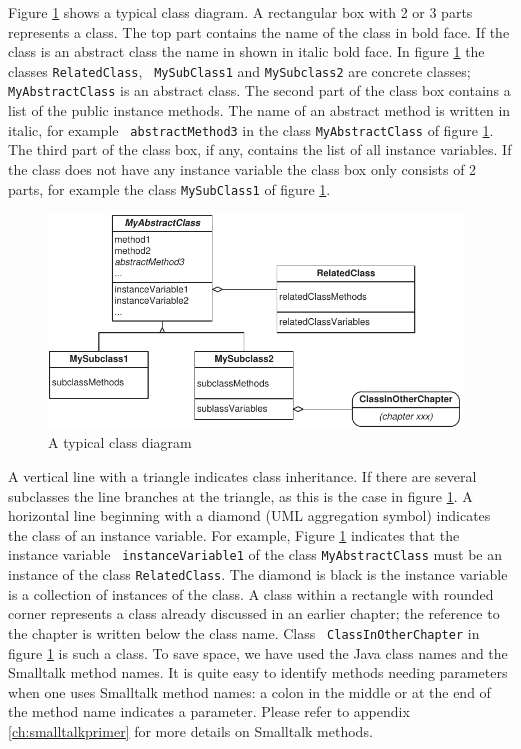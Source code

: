 \documentclass[twoside]{book}
\begin{document}
Figure \ref{fig:classDiagram} shows a typical class diagram. A
rectangular box with 2 or 3 parts represents a class. The top part
contains the name of the class in bold face. If the class is an
abstract class the name in shown in italic bold face. In figure
\ref{fig:classDiagram} the classes {\tt RelatedClass}, {\tt
MySubClass1} and {\tt MySubclass2} are concrete classes; {\tt
MyAbstractClass} is an abstract class. The second part of the
class box contains a list of the public instance methods. The name
of an abstract method is written in italic, for example {\tt
abstractMethod3} in the class {\tt MyAbstractClass} of figure
\ref{fig:classDiagram}. The third part of the class box, if any,
contains the list of all instance variables. If the class does not
have any instance variable the class box only consists of 2 parts,
for example the class {\tt MySubClass1} of figure
\ref{fig:classDiagram}.
\begin{figure}
\centering\includegraphics[width=11cm]{Figures/TypicalClassDiagram}
\caption{A typical class diagram} \label{fig:classDiagram}
\end{figure}

A vertical line with a triangle indicates class inheritance. If
there are several subclasses the line branches at the triangle, as
this is the case in figure \ref{fig:classDiagram}. A horizontal
line beginning with a diamond (UML aggregation symbol) indicates
the class of an instance variable. For example, Figure
\ref{fig:classDiagram} indicates that the instance variable {\tt
instanceVariable1} of the class {\tt MyAbstractClass} must be an
instance of the class {\tt RelatedClass}. The diamond is black is
the instance variable is a collection of instances of the class. A
class within a rectangle with rounded corner represents a class
already discussed in an earlier chapter; the reference to the
chapter is written below the class name. Class {\tt
ClassInOtherChapter} in figure \ref{fig:classDiagram} is such a
class. To save space, we have used the Java class names and the
Smalltalk method names. It is quite easy to identify methods
needing parameters when one uses Smalltalk method names: a
colon in the middle or at the end of the method name indicates
a parameter. Please refer to appendix \ref{ch:smalltalkprimer} for
more details on Smalltalk methods.
\end{document}
